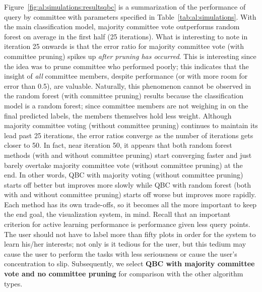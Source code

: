 Figure~\ref{fig:al:simulations:resultsqbc} is a summarization of the 
performance of query by committee with parameters specified in 
Table~\ref{tab:al:simulations}. With the main classification model, majority 
committee vote outperforms random forest on 
average in the first half (25 iterations). What is interesting to note in 
iteration 25 onwards is that the error ratio for majority committee vote (with 
committee pruning) spikes up \textit{after pruning has occurred}. 
This is interesting since the idea was to prune committee who performed poorly; 
this indicates that the insight of \textit{all} committee members, 
despite performance (or with more room for error than 0.5), are valuable. 
Naturally, this phenomenon cannot be observed in the random forest (with 
committee pruning) results because the classification model is a random forest; 
since committee members are not weighing in on the final predicted labels, the 
members themselves hold less weight. Although majority committee voting 
(without committee pruning)
continues to maintain its lead past 25 iterations, the error ratios converge as 
the number of iterations gets closer to 50. In fact, near iteration 50, it 
appears that both random forest methods (with and without committee pruning) 
start converging faster and just barely overtake majority committee vote 
(without committee pruning) at the end. In other words, QBC with majority 
voting (without committee pruning) starts off better but improves more slowly 
while QBC with random forest (both with and without committee pruning)
starts off worse but improves more rapidly.
Each method has its own trade-offs, so it becomes all the more important to 
keep the end goal, the visualization system, in mind. Recall that an important 
criterion for active learning performance is performance given {less query
points}. The user should not have to label more than fifty plots in order for 
the system to learn his/her interests; not only is it tedious for the user, but 
this tedium may cause the user to perform the tasks with less seriousness or 
cause the user's concentration to slip. Subsequently, we select \textbf{QBC 
with majority committee vote and no committee pruning} for comparison with the 
other algorithm types.

